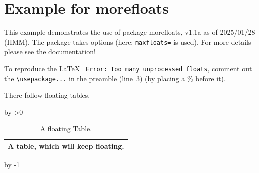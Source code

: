 \documentclass[british]{article}[2024/06/29]%
\begin{document}
\makeatletter

\section*{Example for morefloats}

This example demonstrates the use of package\newline
\textsf{morefloats}, v1.1a as of 2025/01/28 (HMM).\newline
The package takes options (here:
\verb|maxfloats=|\texttt{\morefloats@maxfloats} is used).\newline
For more details please see the documentation!\newline

To reproduce the\newline
\LaTeX{} \texttt{ Error: Too many unprocessed floats},\newline
comment out the \verb|\usepackage...| in the preamble
(line~3)\newline
(by placing a \% before it).\bigskip

There follow \morefloats@maxfloats{} floating tables.

\pagebreak

\relax%
\advance\@tempcnta by \morefloats@morefloats%
\loop
  \ifnum\@tempcnta>0\relax%
  \begin{table}[t]\centering%
    \begin{tabular}{|l|}%
      \hline%
      A table, which will keep floating.\\%
      \hline
    \end{tabular}%
    \caption{A floating Table.}%
  \end{table}%
  \advance\@tempcnta by -1\relax%
\repeat

\makeatother
\end{document}
